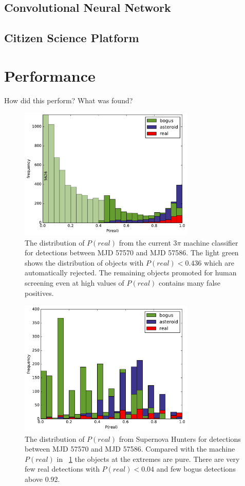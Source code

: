 \documentclass[a4paper,fleqn,usenatbib]{mnras}
\begin{document}
\subsection{Convolutional Neural Network}
\subsection{Citizen Science Platform}

\section{Performance}

How did this perform? What was found?



\begin{figure}
   \includegraphics[width=84mm]{figs/machine_hist.pdf}
   \caption{The distribution of $P(real)$ from the current 3$\pi$ machine classifier 
            for detections between MJD 57570 and MJD 57586.  The light green shows the distribution of 
            objects with $P(real) < 0.436$ which are automatically rejected.  The remaining 
            objects promoted for human screening even at high values of $P(real)$ contains
            many false positives.} 
   \label{fig:machine_dist} 
\end{figure}


\begin{figure}
   \includegraphics[width=84mm]{figs/human_hist.pdf}
   \caption{The distribution of $P(real)$ from Supernova Hunters for detections between 
            MJD 57570 and MJD 57586.  Compared with the machine $P(real)$ in ~\ref{fig:machine_dist}
            the objects at the extremes are pure.  There are very few real detections with 
            $P(real) < 0.04$ and few bogus detections above 0.92.} 
   \label{fig:human_dist} 
\end{figure}
\end{document}
